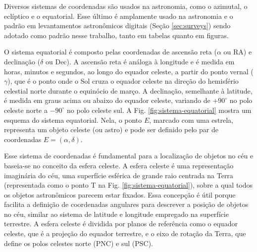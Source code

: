 Diversos sistemas de coordenadas são usados na astronomia, como o azimutal, o eclíptico e o equatorial. Esse último é amplamente usado na astronomia e o padrão em levantamentos astronômicos digitais (Seção \ref{sec:surveys}) sendo adotado como padrão nesse trabalho, tanto em tabelas quanto em figuras.

O sistema equatorial é composto pelas coordenadas de ascensão reta ($\alpha$ ou RA) e declinação ($\delta$ ou Dec). A ascensão reta é análoga à longitude e é medida em horas, minutos e segundos, ao longo do equador celeste, a partir do ponto vernal ($\gamma$), que é o ponto onde o Sol cruza o equador celeste na direção do hemisfério celestial norte durante o equinócio de março. A declinação, semelhante à latitude, é medida em graus acima ou abaixo do equador celeste, variando de $+90^{\circ}$ no polo celeste norte a $-90^{\circ}$ no polo celeste sul. A Fig. \ref{fig:sistema-equatorial} mostra um esquema do sistema equatorial. Nela, o ponto $E$, marcado com uma estrela, representa um objeto celeste (ou astro) e pode ser definido pelo par de coordenadas $E = (\alpha, \delta)$.

Esse sistema de coordenadas é fundamental para a localização de objetos no céu e baseia-se no conceito da esfera celeste. A esfera celeste é uma representação imaginária do céu, uma superfície esférica de grande raio centrada na Terra (representada como o ponto T na Fig. \ref{fig:sistema-equatorial}), sobre a qual todos os objetos astronômicos parecem estar fixados. Essa concepção é útil porque facilita a definição de coordenadas angulares para descrever a posição de objetos no céu, similar ao sistema de latitude e longitude empregado na superfície terrestre. A esfera celeste é dividida por planos de referência como o equador celeste, que é a projeção do equador terrestre, e o eixo de rotação da Terra, que define os polos celestes norte (PNC) e sul (PSC).



